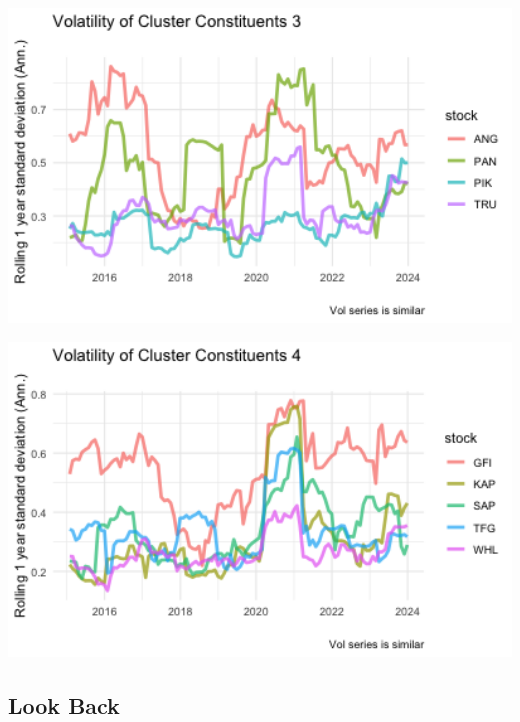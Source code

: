 \documentclass[11pt,preprint, authoryear]{elsarticle}
\let\origfigure\figure
\let\endorigfigure\endfigure
\renewenvironment{figure}[1][2] {
    \expandafter\origfigure\expandafter[H]
} {
    \endorigfigure
}
\numberwithin{equation}{section}
\numberwithin{figure}{section}
\numberwithin{table}{section}
\begin{document}
\begin{figure}[H]

\includegraphics[width=5.56in]{images/volplots_3} \hfill{}

\caption{ Clusters Results from Highest Silhoutte \label{fig2}}\label{fig:unnamed-chunk-6-3}
\end{figure}
\begin{figure}[H]

\includegraphics[width=5.56in]{images/volplots_4} \hfill{}

\caption{ Clusters Results from Highest Silhoutte \label{fig2}}\label{fig:unnamed-chunk-6-4}
\end{figure}
\newpage

\hypertarget{look-back}{%
\subsection{Look Back}\label{look-back}}
\end{document}
